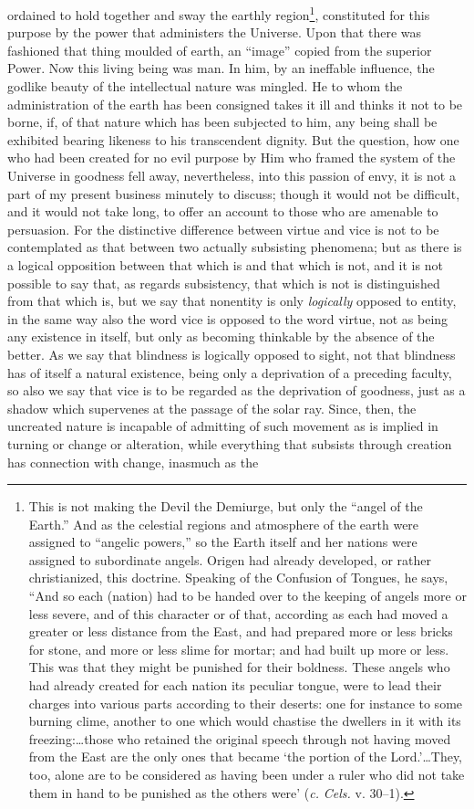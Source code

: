 ordained to hold together and sway the earthly region\footnote{This is not making the Devil the Demiurge, but only the “angel of the Earth.” And as the celestial regions and atmosphere of the earth were assigned to “angelic powers,” so the Earth itself and her nations were assigned to subordinate angels. Origen had already developed, or rather christianized, this doctrine. Speaking of the Confusion of Tongues, he says, “And so each (nation) had to be handed over to the keeping of angels more or less severe, and of this character or of that, according as each had moved a greater or less distance from the East, and had prepared more or less bricks for stone, and more or less slime for mortar; and had built up more or less. This was that they might be punished for their boldness. These angels who had already created for each nation its peculiar tongue, were to lead their charges into various parts according to their deserts: one for instance to some burning clime, another to one which would chastise the dwellers in it with its freezing:…those who retained the original speech through not having moved from the East are the only ones that became ‘the portion of the Lord.’…They, too, alone are to be considered as having been under a ruler who did not take them in hand to be punished as the others were’ (\emph{c.} \emph{Cels.} v. 30–1).}, constituted for this purpose by the power that administers the Universe. Upon that there was fashioned that thing moulded of earth, an “image” copied from the superior Power. Now this living being was man. In him, by an ineffable influence, the godlike beauty of the intellectual nature was mingled. He to whom the administration of the earth has been consigned takes it ill and thinks it not to be borne, if, of that nature which has been subjected to him, any being shall be exhibited bearing likeness to his transcendent dignity. But the question, how one who had been created for no evil purpose by Him who framed the system of the Universe in goodness fell away, nevertheless, into this passion of envy, it is not a part of my present business minutely to discuss; though it would not be difficult, and it would not take long, to offer an account to those who are amenable to persuasion. For the distinctive difference between virtue and vice is not to be contemplated as that between two actually subsisting phenomena; but as there is a logical opposition between that which is and that which is not, and it is not possible to say that, as regards subsistency, that which is not is distinguished from that which is, but we say that nonentity is only \emph{logically} opposed to entity, in the same way also the word vice is opposed to the word virtue, not as being any existence in itself, but only as becoming thinkable by the absence of the better. As we say that blindness is logically opposed to sight, not that blindness has of itself a natural existence, being only a deprivation of a preceding faculty, so also we say that vice is to be regarded as the deprivation of goodness, just as a shadow which supervenes at the passage of the solar ray. Since, then, the uncreated nature is incapable of admitting of such movement as is implied in turning or change or alteration, while everything that subsists through creation has connection with change, inasmuch as the 